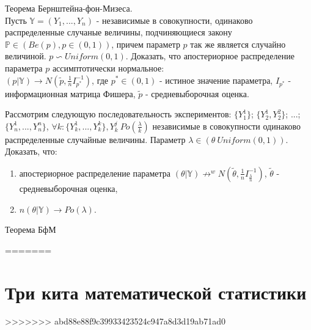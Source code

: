 \begin{problem} Теорема Бернштейна-фон-Мизеса.\\
Пусть $\mathbb{Y} = (Y_1, ..., Y_n)$ - независимые в совокупности, одинаково распределенные случаные величины, подчиняющиеся закону $\mathbb{P} \in (Be(p), p \in (0, 1))$, причем параметр $p$ так же является случайно величиной. $p \backsim Uniform(0,1)$. Доказать, что апостериорное распределение параметра $p$ ассимптотически нормальное:\\
$(p|\mathbb{Y}) \rightarrow N(\tilde{p}, \frac{1}{n}I_{p^*}^{-1})$, где $p^* \in (0, 1)$ - истиное значение параметра, $I_{p^*}$ - информационная матрица Фишера, $\tilde{p}$ - средневыборочная оценка.
\begin{ordre}
\end{ordre}
\end{problem}

\begin{problem}
Рассмотрим следующую последовательность экспериментов:
$\{Y_1^1\}$; $\{Y_2^1, Y_2^2\}$; ...;$\{Y_n^1,..., Y_n^n\}$, $\forall k: \{Y_k^1,...,Y_k^k\}, Y_k^j ~ Po(\frac{\lambda}{k})$ независимые в совокупности одинаково распределенные случайные величины. Параметр $\lambda \in (\theta ~ Uniform(0, 1))$. Доказать, что:
\begin{enumerate}
\item апостериорное распределение параметра $(\theta|\mathbb{Y}) \not\rightarrow^{w} N(\tilde{\theta},\frac{1}{n}I_{\frac{\lambda}{n}}^{-1} )$, $\tilde{\theta}$ - средневыборочная оценка,
\item $n(\theta|\mathbb{Y}) \rightarrow Po(\lambda)$.
\end{enumerate}
\end{problem}
\begin{remark} Теорема БфМ 
\end{remark}

=======
\section{Три кита математической статистики}
>>>>>>> abd88e88f9c39933423524c947a8d3d19ab71ad0
